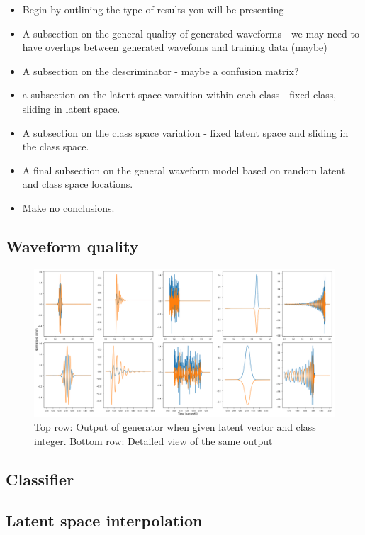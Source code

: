 \documentclass[12pt]{iopart}
\begin{document}
\begin{itemize}
\item Begin by outlining the type of results you will be presenting
\item A subsection on the general quality of generated waveforms - we may need
to have overlaps between generated wavefoms and training data (maybe)
\item A subsection on the descriminator - maybe a confusion matrix?
\item a subsection on the latent space varaition within each class - fixed
class, sliding in latent space.
\item A subsection on the class space variation - fixed latent space and
sliding in the class space.
\item A final subsection on the general waveform model based on random latent
and class space locations.
\item Make no conclusions.
\end{itemize}

\subsection{Waveform quality}
\begin{figure}
    \centering
    \includegraphics[width=\textwidth]{figures/gen_zoom_signals.png}
    \caption{Top row: Output of generator when given latent vector and class integer. Bottom row: Detailed view of the same output}
    \label{fig:gen_signals}
\end{figure}
\subsection{Classifier}
\subsection{Latent space interpolation}
\end{document}
